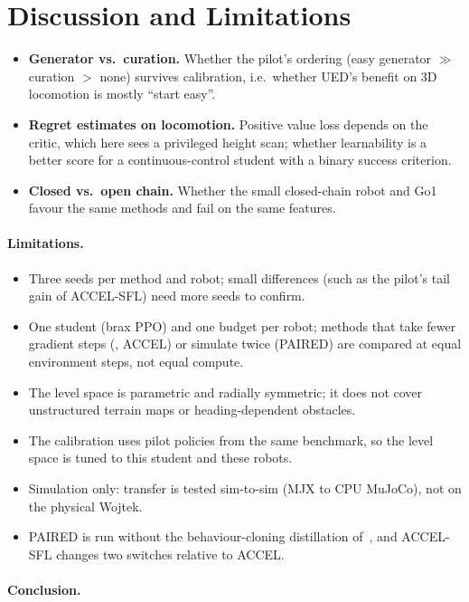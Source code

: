 \section{Discussion and Limitations}
\label{sec:discussion}

\begin{itemize}
  \item \textbf{Generator vs.\ curation.} Whether the pilot's ordering
    (easy generator $\gg$ curation $>$ none) survives calibration, i.e.\
    whether UED's benefit on 3D locomotion is mostly ``start easy''.
  \item \textbf{Regret estimates on locomotion.} Positive value loss
    depends on the critic, which here sees a privileged height scan;
    whether learnability is a better score for a continuous-control
    student with a binary success criterion.
  \item \textbf{Closed vs.\ open chain.} Whether the small closed-chain
    robot and Go1 favour the same methods and fail on the same features.
\end{itemize}

\paragraph{Limitations.}
\begin{itemize}
  \item Three seeds per method and robot; small differences (such as the
    pilot's tail gain of ACCEL-SFL) need more seeds to confirm.
  \item One student (brax PPO) and one budget per robot; methods that
    take fewer gradient steps (\plr, ACCEL) or simulate twice (PAIRED)
    are compared at equal environment steps, not equal compute.
  \item The level space is parametric and radially symmetric; it does not
    cover unstructured terrain maps or heading-dependent obstacles.
  \item The calibration uses pilot policies from the same benchmark, so
    the level space is tuned to this student and these robots.
  \item Simulation only: transfer is tested sim-to-sim (MJX to CPU
    MuJoCo), not on the physical Wojtek.
  \item PAIRED is run without the behaviour-cloning distillation
    of~\citet{mediratta2023stabilizing}, and ACCEL-SFL changes two
    switches relative to ACCEL.
\end{itemize}

\paragraph{Conclusion.}
